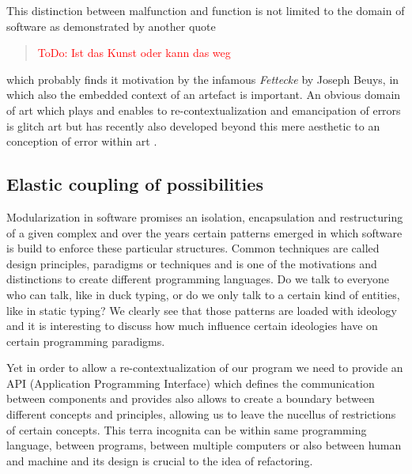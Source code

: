 \documentclass[10pt,twocolumn,letterpaper]{article}
\newcommand\todo[1]{\textcolor{red}{ToDo: #1}}
\begin{document}
This distinction between malfunction and function is not limited to the domain of software as demonstrated by another quote
\begin{quote}
    \todo{Ist das Kunst oder kann das weg}
\end{quote}
which probably finds it motivation by the infamous \textit{Fettecke} by Joseph Beuys, in which also the embedded context of an artefact is important.
An obvious domain of art which plays and enables to re-contextualization and emancipation of errors is glitch art but has recently also developed beyond this mere aesthetic to an conception of error within art \cite{Schubert_2019}.

\subsection{Elastic coupling of possibilities}

Modularization in software promises an isolation, encapsulation and restructuring of a given complex and over the years certain patterns emerged in which software is build to enforce these particular structures.
Common techniques are called design principles, paradigms or techniques and is one of the motivations and distinctions to create different programming languages.
Do we talk to everyone who can talk, like in duck typing, or do we only talk to a certain kind of entities, like in static typing?
We clearly see that those patterns are loaded with ideology and it is interesting to discuss how much influence certain ideologies have on certain programming paradigms.

Yet in order to allow a re-contextualization of our program we need to provide an API (Application Programming Interface) which defines the communication between components and provides also allows to create a boundary between different concepts and principles, allowing us to leave the nucellus of restrictions of certain concepts.
This terra incognita can be within same programming language, between programs, between multiple computers or also between human and machine and its design is crucial to the idea of refactoring. 
\end{document}
